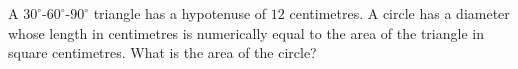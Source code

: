 A $30^\circ$-$60^\circ$-$90^\circ$ triangle has a hypotenuse of $12$ centimetres. A circle has a diameter whose length in centimetres is numerically equal to the area of the triangle in square centimetres. What is the area of the circle?
